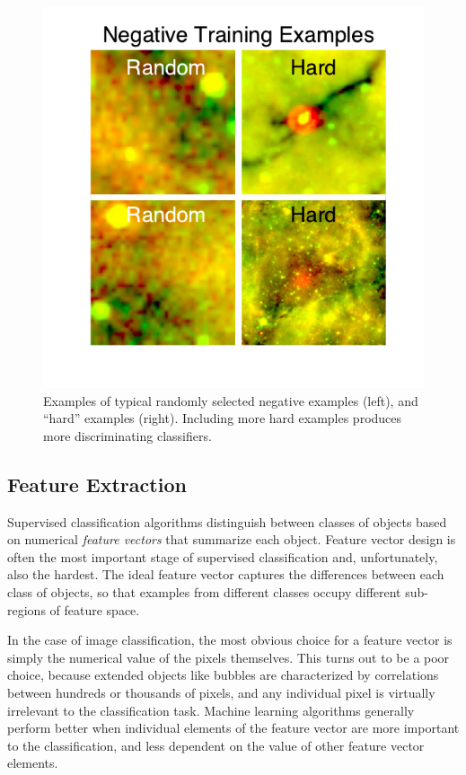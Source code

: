 \begin{figure}[h!]
\includegraphics{bootstrap_neg}
\caption{Examples of typical randomly selected negative examples (left), and ``hard'' examples (right). Including more hard examples produces more discriminating classifiers.}
\label{fig:bootstrap_neg}
\end{figure}

\subsection{Feature Extraction}
\label{sec:method_feature_extraction}
Supervised classification algorithms distinguish between classes of objects based on numerical \textit{feature vectors} that summarize each object. Feature vector design is often the most important stage of supervised classification and, unfortunately, also the hardest. The ideal feature vector captures the differences between each class of objects, so that examples from different classes occupy different sub-regions of feature space.

In the case of image classification, the most obvious choice for a feature vector is simply the numerical value of the pixels themselves. This turns out to be a poor choice, because extended objects like bubbles are characterized by correlations between hundreds or thousands of pixels, and any individual pixel is virtually irrelevant to the classification task. Machine learning algorithms generally perform better when individual elements of the feature vector are more important to the classification, and less dependent on the value of other feature vector elements.


